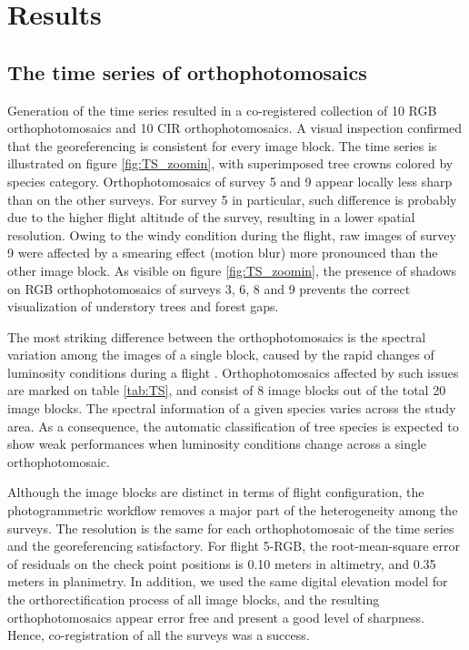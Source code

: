 \documentclass[remotesensing,article,submit,moreauthors,pdftex,12pt,a4paper]{mdpi} %
\begin{document}
\section{Results}

\subsection{The time series of orthophotomosaics}

Generation of the time series resulted in a co-registered collection of 10 RGB orthophotomosaics and 10 CIR orthophotomosaics. 
A visual inspection confirmed that the georeferencing is consistent for every image block. 
The time series is illustrated on figure \ref{fig:TS_zoomin}, with superimposed tree crowns colored by species category. 
Orthophotomosaics of survey 5 and 9 appear locally less sharp than on the other surveys. 
For survey 5 in particular, such difference is probably due to the higher flight altitude of the survey, resulting in a lower spatial resolution.
Owing to the windy condition during the flight, raw images of survey 9 were affected by a smearing effect (motion blur) more pronounced than the other image block.
As visible on figure \ref{fig:TS_zoomin}, the presence of shadows on RGB orthophotomosaics of surveys 3, 6, 8 and 9 prevents the correct visualization of understory trees and forest gaps.

The most striking difference between the orthophotomosaics is the spectral variation among the images of a single block, caused by the rapid changes of luminosity conditions during a flight \cite{honkavaara_digital_2009}. 
Orthophotomosaics affected by such issues are marked on table \ref{tab:TS}, and consist of 8 image blocks out of the total 20 image blocks. 
The spectral information of a given species varies across the study area. 
As a consequence, the automatic classification of tree species is expected to show weak performances when luminosity conditions change across a single orthophotomosaic.

Although the image blocks are distinct in terms of flight configuration, the photogrammetric workflow removes a major part of the heterogeneity among the surveys. 
The resolution is the same for each orthophotomosaic of the time series and the georeferencing satisfactory. 
For flight 5-RGB, the root-mean-square error of residuals on the check point positions is 0.10 meters in altimetry, and 0.35 meters in planimetry. %
In addition, we used the same digital elevation model for the orthorectification process of all image blocks, and the resulting orthophotomosaics appear error free and present a good level of sharpness.  
Hence, co-registration of all the surveys was a success. 
\end{document}
